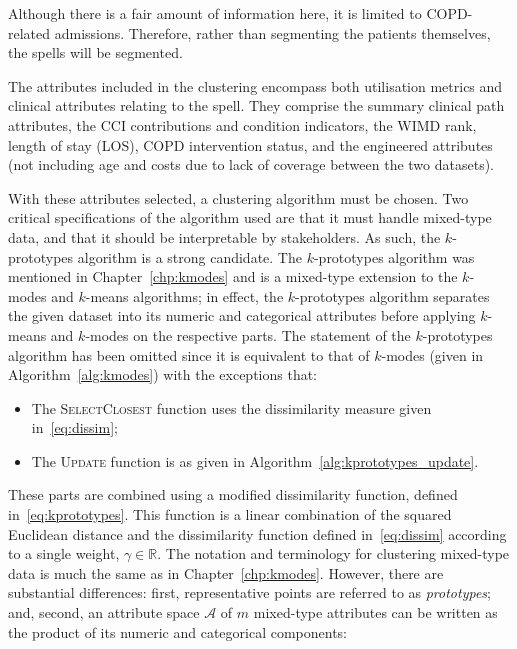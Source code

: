 Although there is a fair amount of information here, it is limited to
COPD-related admissions. Therefore, rather than segmenting the patients
themselves, the spells will be segmented. 

The attributes included in the clustering encompass both utilisation metrics and
clinical attributes relating to the spell. They comprise the summary clinical
path attributes, the CCI contributions and condition indicators, the WIMD rank,
length of stay (LOS), COPD intervention status, and the engineered attributes
(not including age and costs due to lack of coverage between the two datasets).

With these attributes selected, a clustering algorithm must be chosen. Two
critical specifications of the algorithm used are that it must handle mixed-type
data, and that it should be interpretable by stakeholders. As such, the
\(k\)-prototypes algorithm is a strong candidate. The \(k\)-prototypes algorithm
was mentioned in Chapter~\ref{chp:kmodes} and is a mixed-type extension to the
\(k\)-modes and \(k\)-means algorithms; in effect, the \(k\)-prototypes
algorithm separates the given dataset into its numeric and categorical
attributes before applying \(k\)-means and \(k\)-modes on the respective parts.
The statement of the \(k\)-prototypes algorithm has been omitted since it is
equivalent to that of \(k\)-modes (given in Algorithm~\ref{alg:kmodes}) with the
exceptions that:

\begin{itemize}
    \item The \textsc{SelectClosest} function uses the dissimilarity measure
        given in~\eqref{eq:dissim};
    \item The \textsc{Update} function is as given in
        Algorithm~\ref{alg:kprototypes_update}.
\end{itemize}

These parts are combined using a modified dissimilarity function, defined
in~\eqref{eq:kprototypes}. This function is a linear combination of the squared
Euclidean distance and the dissimilarity function defined in~\eqref{eq:dissim}
according to a single weight, \(\gamma \in \mathbb R\). The notation and
terminology for clustering mixed-type data is much the same as in
Chapter~\ref{chp:kmodes}. However, there are substantial differences: first,
representative points are referred to as \emph{prototypes}; and, second, an
attribute space \(\mathcal A\) of \(m\) mixed-type attributes can be written as
the product of its numeric and categorical components:

